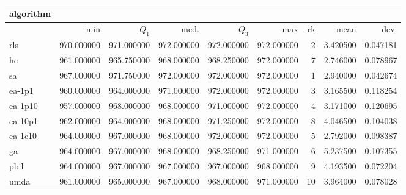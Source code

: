 \begin{tabular}{@{}l*{5}{>{{}}N{3}{0}}>{{}}N{2}{0}N{1}{3}N{1}{3}@{}}
\toprule
{algorithm} &  &  \\
\midrule
& {min} & {$Q_1$} & {med.} & {$Q_3$} & {max} & {rk} & {mean} & {dev.} \\
\midrule
rls & {\color{blue}} 970.000000 & 971.000000 & {\color{blue}} 972.000000 & {\color{blue}} 972.000000 & {\color{blue}} 972.000000 & 2 & 3.420500 & 0.047181 \\
 hc & 961.000000 & 965.750000 & 968.000000 & 968.250000 & {\color{blue}} 972.000000 & 7 & 2.746000 & 0.078967 \\
 sa & 967.000000 & {\color{blue}} 971.750000 & {\color{blue}} 972.000000 & {\color{blue}} 972.000000 & {\color{blue}} 972.000000 & 1 & 2.940000 & 0.042674 \\
 ea-1p1 & 960.000000 & 964.000000 & 971.000000 & {\color{blue}} 972.000000 & {\color{blue}} 972.000000 & 3 & 3.165500 & 0.118254 \\
 ea-1p10 & 957.000000 & 968.000000 & 968.000000 & 971.000000 & {\color{blue}} 972.000000 & 4 & 3.171000 & 0.120695 \\
 ea-10p1 & 962.000000 & 964.000000 & 968.000000 & 971.250000 & {\color{blue}} 972.000000 & 8 & 4.046500 & 0.104038 \\
 ea-1c10 & 964.000000 & 967.000000 & 968.000000 & {\color{blue}} 972.000000 & {\color{blue}} 972.000000 & 5 & 2.792000 & 0.098387 \\
 ga & 964.000000 & 967.000000 & 968.000000 & 968.250000 & 971.000000 & 6 & 5.237500 & 0.107355 \\
 pbil & 964.000000 & 967.000000 & 967.000000 & 967.000000 & 968.000000 & 9 & 4.193500 & 0.072204 \\
 umda & 961.000000 & 965.000000 & 967.000000 & 968.000000 & 971.000000 & 10 & 3.964000 & 0.078028 \\
 \bottomrule
\end{tabular}
